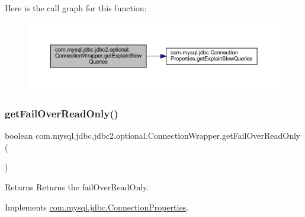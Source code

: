 Here is the call graph for this function\+:
\nopagebreak
\begin{figure}[H]
\begin{center}
\leavevmode
\includegraphics[width=350pt]{classcom_1_1mysql_1_1jdbc_1_1jdbc2_1_1optional_1_1_connection_wrapper_adc6ad75acb4cedeadb60e9676687734e_cgraph}
\end{center}
\end{figure}
\mbox{\label{classcom_1_1mysql_1_1jdbc_1_1jdbc2_1_1optional_1_1_connection_wrapper_a04fd603d5a300468472f5ddc26e5a56c}} 
\subsubsection{\texorpdfstring{get\+Fail\+Over\+Read\+Only()}{getFailOverReadOnly()}}
{\footnotesize\ttfamily boolean com.\+mysql.\+jdbc.\+jdbc2.\+optional.\+Connection\+Wrapper.\+get\+Fail\+Over\+Read\+Only (\begin{DoxyParamCaption}{ }\end{DoxyParamCaption})}

\begin{DoxyReturn}{Returns}
Returns the fail\+Over\+Read\+Only. 
\end{DoxyReturn}


Implements \mbox{\hyperlink{interfacecom_1_1mysql_1_1jdbc_1_1_connection_properties_a14f395dcf2b5c008aef09513895925f7}{com.\+mysql.\+jdbc.\+Connection\+Properties}}.

